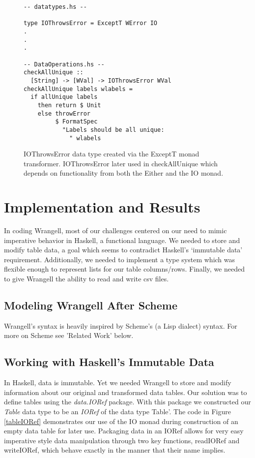 \documentclass[preprint,nocopyrightspace]{sig-alternate}
\begin{document}
\begin{figure}
\begin{lstlisting}
-- datatypes.hs --

type IOThrowsError = ExceptT WError IO
.
.
.

-- DataOperations.hs --
checkAllUnique :: 
  [String] -> [WVal] -> IOThrowsError WVal
checkAllUnique labels wlabels = 
  if allUnique labels
    then return $ Unit 
    else throwError 
         $ FormatSpec 
           "Labels should be all unique: 
             " wlabels

\end{lstlisting}
\caption{IOThrowsError data type created via the ExceptT monad transformer. IOThrowsError later used in checkAllUnique which depends on functionality from both the Either and the IO monad.}
\label{IOThrowsError}
\end{figure}

  

\section{Implementation and Results}

In coding Wrangell, most of our challenges centered on our need to mimic imperative behavior in Haskell, a functional language. We needed to store and modify table data, a goal which seems to contradict Haskell's `immutable data' requirement. Additionally, we needed to implement a type system which was flexible enough to represent lists for our table columns/rows. Finally, we needed to give Wrangell the ability to read and write csv files.

\subsection{Modeling Wrangell After Scheme}
Wrangell's syntax is heavily inspired by Scheme's (a Lisp dialect) syntax. For more on Scheme see 'Related Work' below. 


\subsection{Working with Haskell's Immutable Data}
In Haskell, data is immutable. Yet we needed Wrangell to store and modify information about our original and transformed data tables. Our solution was to define tables using the \emph{data.IORef} package. With this package we constructed our \emph{Table} data type to be an \emph{IORef} of the data type Table'. The code in Figure \ref{tableIORef} demonstrates our use of the IO monad during construction of an empty data table for later use. Packaging data in an IORef allows for very easy imperative style data manipulation through two key functions, readIORef and writeIORef, which behave exactly in the manner that their name implies. 
\end{document}
